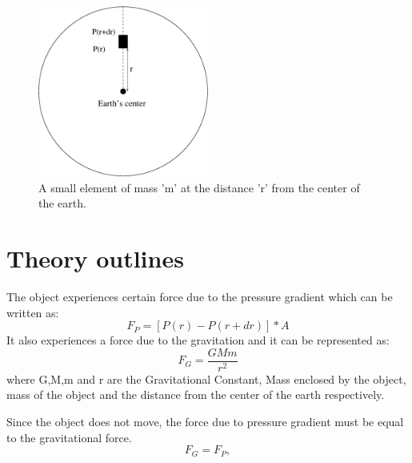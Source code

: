 \documentclass[12pt]{article}
\begin{document}
\begin{figure}[H]
\centering
\includegraphics[width=0.5\textwidth]{earth_pressure.eps}\caption{A small element of mass 'm' at the distance 'r' from the center of the earth.}
\end{figure}

\section{Theory outlines}
The object experiences certain force due to the pressure gradient which can be written as:
\begin{equation}
F_P = [P(r) - P(r+dr)]*A
\end{equation}
It also experiences a force due to the gravitation and it can be represented as:
\begin{equation}
F_G = \frac{GMm}{r^2}
\end{equation}
where G,M,m and r are the Gravitational Constant, Mass enclosed by the object, mass of the object and the distance from the center of the earth respectively. 

Since the object does not move, the force due to pressure gradient must be equal to the gravitational force.
\begin{equation}
F_G = F_P,
\end{equation}
\end{document}
